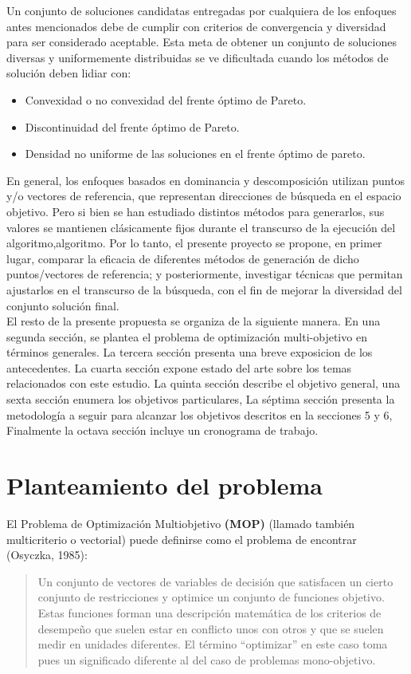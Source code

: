 \documentclass[letterpaper,10pt]{article}
\begin{document}
Un conjunto de soluciones candidatas entregadas por cualquiera de los enfoques antes mencionados debe de cumplir con criterios de convergencia y diversidad para ser
considerado aceptable. Esta meta de obtener un conjunto de soluciones diversas y uniformemente distribuidas se ve dificultada cuando los métodos de solución deben lidiar con:

\begin{itemize}
 \item Convexidad o no convexidad del frente óptimo de Pareto.
 \item Discontinuidad del frente óptimo de Pareto.
 \item Densidad no uniforme de las soluciones en el frente óptimo de pareto.
\end{itemize}

En general, los enfoques basados en dominancia y descomposición utilizan puntos y/o vectores de referencia, que representan direcciones de búsqueda en el espacio objetivo. Pero si bien se han estudiado distintos métodos para generarlos,
sus valores se mantienen clásicamente fijos durante el transcurso de la ejecución del algoritmo,algoritmo. Por lo tanto, el presente proyecto se propone, en primer lugar, comparar la eficacia de diferentes métodos de generación de dicho puntos/vectores de referencia;
y posteriormente, investigar técnicas que permitan ajustarlos en el transcurso de la búsqueda, con el fin de mejorar la diversidad del conjunto solución final.\\

El resto de la presente propuesta se organiza de la siguiente manera. En una segunda sección, se plantea el problema de optimización multi-objetivo en términos generales.
La tercera sección presenta una breve exposicion de los antecedentes. La cuarta sección expone estado del arte sobre los temas relacionados con este estudio. La quinta sección describe el objetivo general, 
una sexta sección enumera los objetivos particulares, La séptima sección presenta la metodología a seguir para alcanzar los objetivos descritos en la secciones 5 y 6, 
Finalmente la octava sección incluye un cronograma de trabajo.

 
\section{Planteamiento del problema}

El Problema de Optimización Multiobjetivo \textbf{(MOP)} (llamado también
multicriterio o vectorial) puede definirse como el problema de
encontrar (Osyczka, 1985)\cite{Osyczka1985193}:
\begin{quote}
Un conjunto de vectores de variables de decisión que satisfacen un cierto
conjunto de restricciones y optimice un conjunto de funciones
objetivo. Estas funciones forman una descripción matemática
de los criterios de desempeño que suelen estar en conflicto
unos con otros y que se suelen medir en unidades diferentes.
El término ``optimizar'' en este caso toma pues un significado
diferente al del caso de problemas mono-objetivo.
\end{quote}
\end{document}
